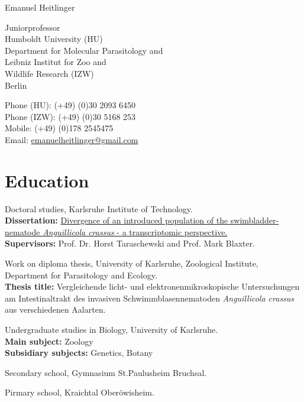 \documentclass[10pt,a4paper]{article}
\def\name{Emanuel Heitlinger}
\renewenvironment{itemize}{
  \begin{list}{}{
    \setlength{\leftmargin}{2.5em}
    \setlength{\itemsep}{0.25em}
    \setlength{\parskip}{0pt}
    \setlength{\parsep}{0.25em}
  }
}{
  \end{list}
}
\begin{document}
{\huge \name}


\bigskip

\begin{minipage}[t]{0.5\textwidth}
  Juniorprofessor\\
  Humboldt University (HU) \\
  Department for Molecular Parasitology and \\
  Leibniz Institut for Zoo and \\
  Wildlife Research (IZW) \\
  Berlin
\end{minipage}
\begin{minipage}[t]{0.5\textwidth}
  Phone (HU): (+49) (0)30 2093 6450 \\
  Phone (IZW): (+49) (0)30 5168 253 \\
  Mobile: (+49) (0)178 2545475 \\
  Email: \href{mailto:emanuelheitlinger@gmail.com}{emanuelheitlinger@gmail.com} \\
\end{minipage}

\section*{Education}

\begin{itemize}
\item [Jun 2008 - Feb 2012] Doctoral studies, Karlsruhe Institute of Technology.\\
  \textbf{Dissertation:} 
  \href{http://digbib.ubka.uni-karlsruhe.de/volltexte/1000027222}
  {Divergence of an introduced population
    of the swimbladder-nematode \textit{Anguillicola crassus} - a
    transcriptomic perspective.}\\
  \textbf{Supervisors:}
  Prof. Dr. Horst Taraschewski and Prof. Mark Blaxter.
\item [Jun 2007 - Feb 2008] Work on diploma thesis, University of Karlsruhe,
  Zoological Institute, Department for Parasitology and Ecology.\\
  \textbf{Thesis title:} Vergleichende licht- und
  elektronenmikroskopische Untersuchungen am Intestinaltrakt des
  invasiven Schwimmblasennematoden \textit{Anguillicola crassus} aus
  verschiedenen Aalarten.
\item [2001 - 2007] Undergraduate studies in Biology, University of
  Karlsruhe.\\
  \textbf{Main subject:} Zoology\\
  \textbf{Subsidiary subjects:} Genetics, Botany
\item [1991 - 2000] Secondary school, Gymnasium St.Paulusheim
  Bruchsal.
\item [1987 - 1991] Pirmary school, Kraichtal Ober\"owisheim.
\end{itemize}
\end{document}
